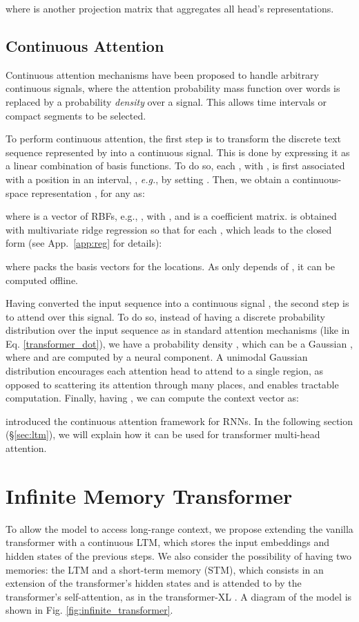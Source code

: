 \documentclass[11pt]{article}
\begin{document}
where  is another projection matrix that aggregates all head's representations. 


\subsection{Continuous Attention}

Continuous attention mechanisms \citep{martins2020sparse} have been proposed to handle arbitrary continuous signals, where the attention probability mass function over words is replaced by a probability \textit{density} over a signal. This allows time intervals or compact segments to be selected. 

To perform continuous attention, the first step is to transform the discrete text sequence represented by  into a continuous signal. 
This is done by expressing it as a linear combination of basis functions.
To do so, each , with , is first associated with a position in an interval, , \textit{e.g.}, by setting . Then, 
we obtain a continuous-space representation , for any  as:


where  is a vector of  RBFs, e.g., , with , and  is a coefficient matrix.  is obtained with multivariate ridge regression \citep{brown1980adaptive} so that  for each , which leads to the closed form (see App.~\ref{app:reg} for details):

where  packs the basis vectors for the  locations. As  only depends of , it can be computed offline.

Having converted the input sequence into a continuous signal , the second step is to attend over this signal. To do so, instead of having a discrete probability distribution over the input sequence as in standard attention mechanisms (like in Eq. \ref{transformer_dot}), we have a probability density , which can be a Gaussian , where  and  are computed by a neural component. A unimodal Gaussian distribution encourages each attention head to attend to a single region, as opposed to scattering its attention through many places, and enables tractable computation.
Finally, having , we can compute the context vector  as:


\citet{martins2020sparse} introduced the continuous attention framework for RNNs. In the following section (\S\ref{sec:ltm}), we will explain how it can be used for transformer multi-head attention.

\section{Infinite Memory Transformer}
To allow the model to access long-range context, we propose extending the vanilla transformer with a continuous LTM, which stores the input embeddings and hidden states of the previous steps. 
We also consider the possibility of having two memories: the LTM and a short-term memory (STM), which consists in an extension of the transformer's hidden states and is attended to by the transformer's self-attention, as in the transformer-XL \citep{dai2019transformer}.
A diagram of the model is shown in Fig. \ref{fig:infinite_transformer}. 
\end{document}
